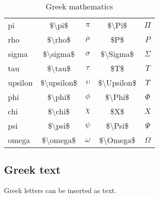 \documentclass[10pt, letterpaper, twoside]{article}
\begin{document}
\begin{table}[H]
\begin{flushleft}
\begin{tabular}{lcccc}
pi      & \$\textbackslash pi\$      & $\pi$      & \$\textbackslash Pi\$      & $\Pi$ \\
rho     & \$\textbackslash rho\$     & $\rho$     & \$P\$                      & $P$ \\
sigma   & \$\textbackslash sigma\$   & $\sigma$   & \$\textbackslash Sigma\$   & $\Sigma$ \\
tau     & \$\textbackslash tau\$     & $\tau$     & \$T\$                      & $T$ \\
upsilon & \$\textbackslash upsilon\$ & $\upsilon$ & \$\textbackslash Upsilon\$ & $\Upsilon$ \\
phi     & \$\textbackslash phi\$     & $\phi$     & \$\textbackslash Phi\$     & $\Phi$ \\
chi     & \$\textbackslash chi\$     & $\chi$     & \$X\$                      & $X$ \\
psi     & \$\textbackslash psi\$     & $\psi$     & \$\textbackslash Psi\$     & $\Psi$ \\
omega   & \$\textbackslash omega\$   & $\omega$   & \$\textbackslash Omega\$   & $\Omega$ \\
\bottomrule
\end{tabular}
\label{tab:greek_mathematics}
\caption{Greek mathematics}
\end{flushleft}
\end{table}

\newpage
\subsection{Greek text}\label{sec:greek_text}

Greek letters can be inserted as text.
\end{document}
